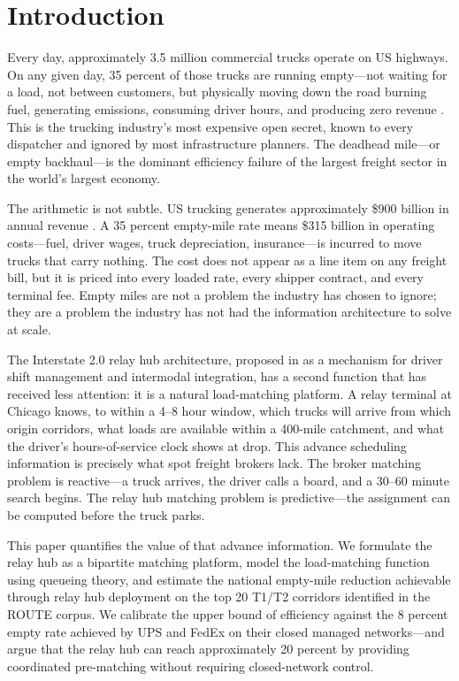 \section{Introduction}
\label{sec:introduction}

Every day, approximately 3.5 million commercial trucks operate on US highways. On any given day, 35 percent of those trucks are running empty---not waiting for a load, not between customers, but physically moving down the road burning fuel, generating emissions, consuming driver hours, and producing zero revenue \citep{ATRI_costs2024}. This is the trucking industry's most expensive open secret, known to every dispatcher and ignored by most infrastructure planners. The deadhead mile---or empty backhaul---is the dominant efficiency failure of the largest freight sector in the world's largest economy.

The arithmetic is not subtle. US trucking generates approximately \$900 billion in annual revenue \citep{BLS_trucking2023}. A 35 percent empty-mile rate means \$315 billion in operating costs---fuel, driver wages, truck depreciation, insurance---is incurred to move trucks that carry nothing. The cost does not appear as a line item on any freight bill, but it is priced into every loaded rate, every shipper contract, and every terminal fee. Empty miles are not a problem the industry has chosen to ignore; they are a problem the industry has not had the information architecture to solve at scale.

The Interstate 2.0 relay hub architecture, proposed in \citet{ROUTE_F3} as a mechanism for driver shift management and intermodal integration, has a second function that has received less attention: it is a natural load-matching platform. A relay terminal at Chicago knows, to within a 4--8 hour window, which trucks will arrive from which origin corridors, what loads are available within a 400-mile catchment, and what the driver's hours-of-service clock shows at drop. This advance scheduling information is precisely what spot freight brokers lack. The broker matching problem is reactive---a truck arrives, the driver calls a board, and a 30--60 minute search begins. The relay hub matching problem is predictive---the assignment can be computed before the truck parks.

This paper quantifies the value of that advance information. We formulate the relay hub as a bipartite matching platform, model the load-matching function using queueing theory, and estimate the national empty-mile reduction achievable through relay hub deployment on the top 20 T1/T2 corridors identified in the ROUTE corpus. We calibrate the upper bound of efficiency against the 8 percent empty rate achieved by UPS and FedEx on their closed managed networks---and argue that the relay hub can reach approximately 20 percent by providing coordinated pre-matching without requiring closed-network control.

